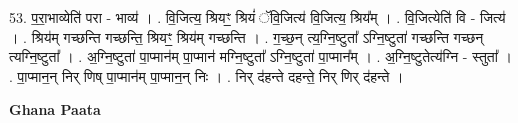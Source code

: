 \documentclass[17pt]{extarticle}
\begin{document}
53. प॒रा॒भाव्येति॑ परा - भाव्य॑ । . वि॒जित्य॒ श्रियꣳ॒॒ श्रियं॑ ॅवि॒जित्य॑ वि॒जित्य॒ श्रिय᳚म् । . वि॒जित्येति॑ वि - जित्य॑ । . श्रिय॑म् गच्छन्ति गच्छन्ति॒ श्रियꣳ॒॒ श्रिय॑म् गच्छन्ति । . ग॒च्छ॒न् त्य॒ग्नि॒ष्टुता᳚ ऽग्नि॒ष्टुता॑ गच्छन्ति गच्छन् त्यग्नि॒ष्टुता᳚ । . अ॒ग्नि॒ष्टुता॑ पा॒प्मान॑म् पा॒प्मान॑ मग्नि॒ष्टुता᳚ ऽग्नि॒ष्टुता॑ पा॒प्मान᳚म् । . अ॒ग्नि॒ष्टुतेत्य॑ग्नि - स्तुता᳚ । . पा॒प्मान॒न् निर् णिष् पा॒प्मान॑म् पा॒प्मान॒न् निः । . निर् द॑हन्ते दहन्ते॒ निर् णिर् द॑हन्ते । \newline

\textbf{Ghana Paata } \newline
\end{document}
